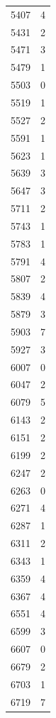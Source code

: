 \documentclass{article}
\theoremstyle{definition}
\begin{document}
\begin{table}[htbp]
\begin{minipage}{0.135\textwidth}
\begin{tabular}{c|c}
        5407 & 4 \\
        5431 & 2 \\
        5471 & 3 \\
        5479 & 1 \\
        5503 & 0 \\
        5519 & 1 \\
        5527 & 2 \\
        5591 & 1 \\
        5623 & 1 \\
        5639 & 3 \\
        5647 & 3 \\
        5711 & 2 \\
        5743 & 1 \\
        5783 & 1 \\
        5791 & 4 \\
        5807 & 2 \\
        5839 & 4 \\
        5879 & 3 \\
        5903 & 7 \\
        5927 & 3 \\
        6007 & 0 \\
        6047 & 2 \\
        6079 & 5 \\
        6143 & 2 \\
        6151 & 2 \\
        6199 & 2 \\
        6247 & 2 \\
        6263 & 0 \\
        6271 & 4 \\
        6287 & 1 \\
        6311 & 2 \\
        6343 & 1 \\
        6359 & 4 \\
        6367 & 4 \\
        6551 & 4 \\
        6599 & 3 \\
        6607 & 0 \\
        6679 & 2 \\
        6703 & 1 \\
        6719 & 7
    \end{tabular}
\end{minipage}\hspace{-2mm}
%
\begin{minipage}{0.135\textwidth}
    \centering

\end{minipage}
\end{table}
\end{document}
